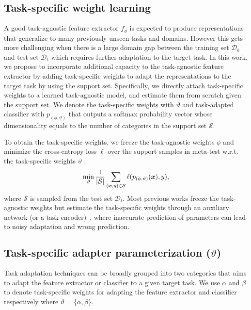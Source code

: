 \subsection{Task-specific weight learning}
A good task-agnostic feature extractor $f_{\phi}$ is expected to produce representations that generalize to many previously unseen tasks and domains.
However this gets more challenging when there is a large domain gap between the training set $\mathcal{D}_b$ and test set $\mathcal{D}_t$ which requires further adaptation to the target task.
In this work, we propose to incorporate additional capacity to the task-agnostic feature extractor by adding task-specific weights to adapt the representations to the target task by using the support set. Specifically, we directly attach task-specific weights to a learned task-agnostic model, and estimate them from scratch given the support set.
We denote the task-specific weights with $\vartheta$ and task-adapted classifier with $p_{(\phi,\vartheta)}$ that outputs a softmax probability vector whose dimensionality equals to the number of categories in the support set $\mathcal{S}$.

To obtain the task-specific weights, we freeze the task-agnostic weights $\phi$ and minimize the cross-entropy loss $\ell$ over the support samples in meta-test w.r.t. the task-specific weights $\vartheta$ \cite{dvornik2020selecting,tian2020rethinking,li2021universal}:
\begin{equation}
    \label{eq:learn-tsw}
\min_{\vartheta}\frac{1}{|\mathcal{S}|}\sum_{(\bm{x}, y) \in \mathcal{S}} \ell(p_{(\phi,\vartheta)}(\bm{x}),y),
\end{equation} where $\mathcal{S}$ is sampled from the test set $\mathcal{D}_t$. 
Most previous works freeze the task-agnostic weights but estimate the task-specific weights through an auxiliary network (or a task encoder)~\cite{requeima2019fast,bateni2020improved,li2021universal,triantafillou2021flute}, where inaccurate prediction of parameters can lead to noisy adaptation and wrong prediction.

 
\subsection{Task-specific adapter parameterization ($\vartheta$)}
Task adaptation techniques can be broadly grouped into two categories that aims
to adapt the feature extractor or classifier to a given target task.
We use $\alpha$ and $\beta$ to denote task-specific weights for adapting the feature extractor and classifier respectively where $\vartheta=\{\alpha, \beta\}$.

